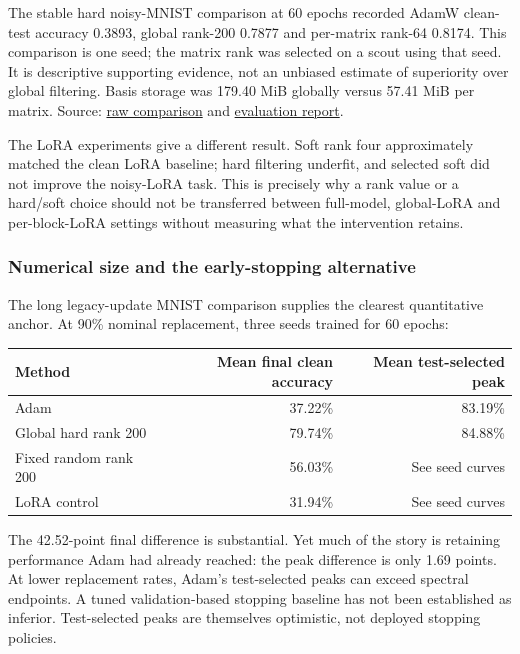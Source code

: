 \documentclass[
  british,
  10pt,
  a4paper,
]{article}
\newcounter{none} %
\begin{document}
The stable hard noisy-\allowbreak{}MNIST comparison at 60 epochs
recorded AdamW clean-test accuracy 0.3893, global rank-200 0.7877 and
per-matrix rank-64 0.8174. This comparison is one seed; the matrix rank
was selected on a scout using that seed. It is descriptive supporting
evidence, not an unbiased estimate of superiority over global filtering.
Basis storage was 179.40 MiB globally versus 57.41 MiB per matrix.
Source: \href{../../../results/noisy_mnist_hard_curves/summary.json}{raw
comparison} and
\href{../../../research/noisy_mnist_hard_curves.md}{evaluation report}.

The LoRA experiments give a different result. Soft rank four
approximately matched the clean LoRA baseline; hard filtering underfit,
and selected soft did not improve the noisy-LoRA task. This is precisely
why a rank value or a hard/soft choice should not be transferred between
full-\allowbreak{}model,\allowbreak{} global-\allowbreak{}LoRA and
per-\allowbreak{}block-\allowbreak{}LoRA settings without measuring what
the intervention retains.

\subsubsection{\texorpdfstring{Numerical size and the
early-\allowbreak{}stopping
alternative}{Numerical size and the  alternative}}\label{synthesis--numerical-size-and-the-early-stopping-alternative}

The long legacy-\allowbreak{}update MNIST comparison supplies the
clearest quantitative anchor. At 90\% nominal replacement,\allowbreak{}
three seeds trained for 60 epochs:

{\def\LTcaptype{none} %
\begin{longtable}[]{@{}lrr@{}}
\toprule\noalign{}
Method & Mean final clean accuracy & Mean test-\allowbreak{}selected
peak \\
\midrule\noalign{}
\endhead
\bottomrule\noalign{}
\endlastfoot
Adam & 37.22\% & 83.19\% \\
Global hard rank 200 & 79.74\% & 84.88\% \\
Fixed random rank 200 & 56.03\% & See seed curves \\
LoRA control & 31.94\% & See seed curves \\
\end{longtable}
}

The 42.\allowbreak{}52-\allowbreak{}point final difference is
substantial.\allowbreak{} Yet much of the story is retaining performance
Adam had already reached: the peak difference is only 1.69 points. At
lower replacement rates, Adam's test-\allowbreak{}selected peaks can
exceed spectral endpoints. A tuned validation-\allowbreak{}based
stopping baseline has not been established as inferior.
Test-\allowbreak{}selected peaks are themselves optimistic,\allowbreak{}
not deployed stopping policies.
\end{document}
